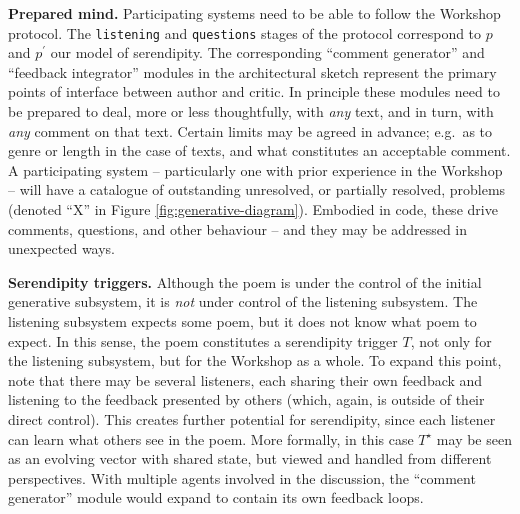 
\noindent \textbf{Prepared mind.}
Participating systems need to be able to follow the Workshop protocol.
The {\tt listening} and {\tt questions} stages of the protocol
correspond to $p$ and $p^{\prime}$ our model of serendipity.  The
corresponding ``comment generator'' and ``feedback integrator''
modules in the architectural sketch represent the primary points of
interface between author and critic. 
In principle these modules need to be prepared to deal, more or less
thoughtfully, with \emph{any} text, and in turn, with \emph{any}
comment on that text.  Certain limits may be agreed in advance;
e.g.~as to genre or length in the case of texts, and what constitutes
an acceptable comment.
A participating system -- particularly one with prior experience in
the Workshop -- will have a catalogue of outstanding unresolved, or
partially resolved, problems (denoted ``X'' in Figure \ref{fig:generative-diagram}).
Embodied in code, these drive comments, questions, and other
behaviour -- and they may be addressed in unexpected ways.\par\medskip

\noindent \textbf{Serendipity triggers.}
Although the poem is under the control of the initial generative
subsystem, it is \emph{not} under control of the listening subsystem.
The listening subsystem expects some poem, but it does not know what
poem to expect.  In this sense, the poem constitutes a serendipity
trigger $T$, not only for the listening subsystem, but for the
Workshop as a whole.
%
To expand this point, note that there may be several listeners, each
sharing their own feedback and listening to the feedback presented by
others (which, again, is outside of their direct control).  This
creates further potential for serendipity, since each listener can
learn what others see in the poem.  More formally, in this case
$T^\star$ may be seen as an evolving vector with shared state, but viewed
and handled from different perspectives.  With multiple agents
involved in the discussion, the ``comment generator'' module would
expand to contain its own feedback loops.\par\medskip

